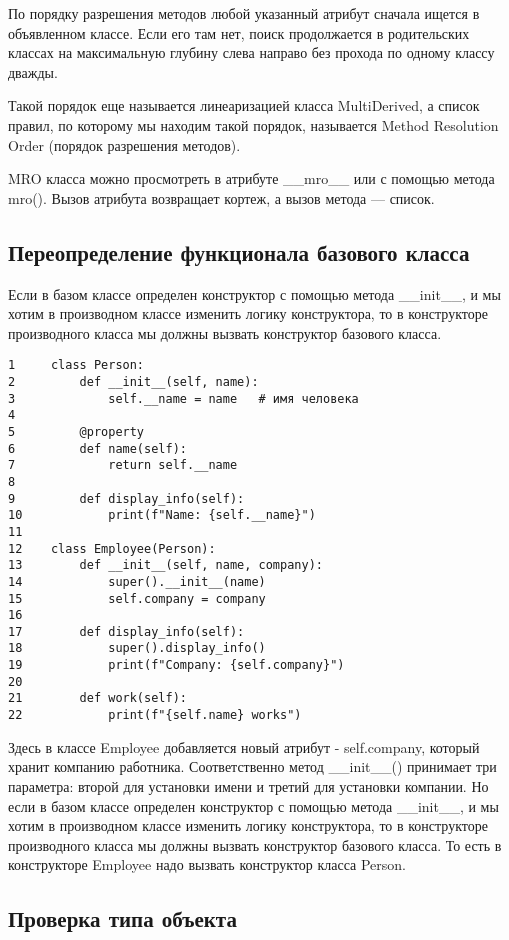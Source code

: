 \documentclass[12pt, a4paper]{article}
\begin{document}
По порядку разрешения методов любой указанный атрибут сначала ищется в объявленном классе. Если его там нет, поиск продолжается в родительских классах на максимальную глубину слева направо без прохода по одному классу дважды.

Такой порядок еще называется линеаризацией класса MultiDerived, а список правил, по которому мы находим такой порядок, называется Method Resolution Order (порядок разрешения методов).


MRO класса можно просмотреть в атрибуте \_\_mro\_\_ или с помощью метода mro(). Вызов атрибута возвращает кортеж, а вызов метода — список.

\subsection{Переопределение функционала базового класса}

Если в базом классе определен конструктор с помощью метода \_\_init\_\_, и мы хотим в производном классе изменить логику конструктора, то в конструкторе производного класса мы должны вызвать конструктор базового класса.

\begin{verbatim}
1     class Person: 
2         def __init__(self, name):
3             self.__name = name   # имя человека
4  
5         @property
6         def name(self):
7             return self.__name
8 
9         def display_info(self):
10            print(f"Name: {self.__name}") 
11 
12    class Employee(Person):
13        def __init__(self, name, company):
14            super().__init__(name)
15            self.company = company
16    
17        def display_info(self):
18            super().display_info()
19            print(f"Company: {self.company}")
20    
21        def work(self):
22            print(f"{self.name} works")
\end{verbatim}

Здесь в классе Employee добавляется новый атрибут - self.company, который хранит компанию работника. Соответственно метод \_\_init\_\_() принимает три параметра: второй для установки имени и третий для установки компании. Но если в базом классе определен конструктор с помощью метода \_\_init\_\_, и мы хотим в производном классе изменить логику конструктора, то в конструкторе производного класса мы должны вызвать конструктор базового класса. То есть в конструкторе Employee надо вызвать конструктор класса Person.

\subsection{Проверка типа объекта}
\end{document}
